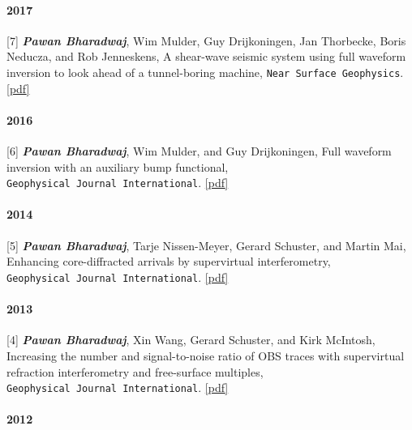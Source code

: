 \documentclass[9pt]{developercv} %
\begin{document}
\paragraph{2017}\label{section-20}

{[}7{]}
\textbf{\emph{Pawan
Bharadwaj}},
Wim
Mulder,
Guy
Drijkoningen,
Jan
Thorbecke,
Boris
Neducza,
and Rob
Jenneskens,
A
shear-wave
seismic
system
using full
waveform
inversion
to look
ahead of a
tunnel-boring
machine,
\texttt{Near\ Surface\ Geophysics}.
\href{https://github.com/pawbz/pawbz.github.io/blob/src/pdf/papers/NSG15_Bharadwaj.pdf}{{[}pdf{]}}

\paragraph{2016}\label{section-21}

{[}6{]}
\textbf{\emph{Pawan
Bharadwaj}},
Wim
Mulder,
and Guy
Drijkoningen,
Full
waveform
inversion
with an
auxiliary
bump
functional,
\texttt{Geophysical\ Journal\ International}.
\href{https://github.com/pawbz/pawbz.github.io/blob/src/pdf/papers/FWI_bump.pdf}{{[}pdf{]}}

\paragraph{2014}\label{section-22}

{[}5{]}
\textbf{\emph{Pawan
Bharadwaj}},
Tarje
Nissen-Meyer,
Gerard
Schuster,
and Martin
Mai,
Enhancing
core-diffracted
arrivals
by
supervirtual
interferometry,
\texttt{Geophysical\ Journal\ International}.
\href{https://github.com/pawbz/pawbz.github.io/blob/src/pdf/papers/GJI_CMB.pdf}{{[}pdf{]}}

\paragraph{2013}\label{section-23}

{[}4{]}
\textbf{\emph{Pawan
Bharadwaj}},
Xin Wang,
Gerard
Schuster,
and Kirk
McIntosh,
Increasing
the number
and
signal-to-noise
ratio of
OBS traces
with
supervirtual
refraction
interferometry
and
free-surface
multiples,
\texttt{Geophysical\ Journal\ International}.
\href{https://github.com/pawbz/pawbz.github.io/blob/src/pdf/papers/svi_GJI2.pdf}{{[}pdf{]}}

\paragraph{2012}\label{section-24}
\end{document}
